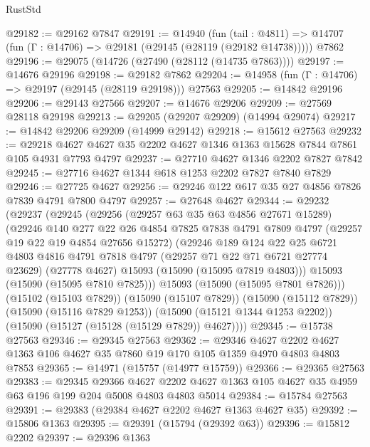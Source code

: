 \begin{lexlean}{RustStd}
\begin{coremodule}
@29182 := @29162 @7847
@29191 := @14940
    (fun (tail : @4811) => @14707 (fun (Γ : @14706) => @29181 (@29145 (@28119 (@29182 @14738)))))
    @7862
@29196 := @29075 (@14726 (@27490 (@28112 (@14735 @7863))))
@29197 := @14676 @29196
@29198 := @29182 @7862
@29204 := @14958 (fun (Γ : @14706) => @29197 (@29145 (@28119 @29198))) @27563
@29205 := @14842 @29196
@29206 := @29143 @27566
@29207 := @14676 @29206
@29209 := @27569 @28118 @29198
@29213 := @29205 (@29207 @29209) (@14994 @29074)
@29217 := @14842 @29206 @29209 (@14999 @29142)
@29218 := @15612 @27563
@29232 := @29218 @4627 @4627 @35 @2202 @4627 @1346 @1363 @15628 @7844 @7861 @105 @4931 @7793 @4797
@29237 := @27710 @4627 @1346 @2202 @7827 @7842
@29245 := @27716 @4627 @1344 @618 @1253 @2202 @7827 @7840 @7829
@29246 := @27725 @4627
@29256 := @29246 @122 @617 @35 @27 @4856 @7826 @7839 @4791 @7800 @4797
@29257 := @27648 @4627
@29344 := @29232
    (@29237
      (@29245
        (@29256
          (@29257 @63 @35 @63 @4856 @27671 @15289)
          (@29246
            @140
            @277
            @22
            @26
            @4854
            @7825
            @7838
            @4791
            @7809
            @4797
            (@29257 @19 @22 @19 @4854 @27656 @15272)
            (@29246
              @189
              @124
              @22
              @25
              @6721
              @4803
              @4816
              @4791
              @7818
              @4797
              (@29257 @71 @22 @71 @6721 @27774 @23629)
              (@27778 @4627)
              @15093
              (@15090 (@15095 @7819 @4803)))
            @15093
            (@15090 (@15095 @7810 @7825)))
          @15093
          (@15090 (@15095 @7801 @7826)))
        (@15102 (@15103 @7829))
        (@15090 (@15107 @7829))
        (@15090 (@15112 @7829))
        (@15090 (@15116 @7829 @1253))
        (@15090 (@15121 @1344 @1253 @2202))
        (@15090 (@15127 (@15128 (@15129 @7829)) @4627))))
@29345 := @15738 @27563
@29346 := @29345 @27563
@29362 := @29346
    @4627
    @2202
    @4627
    @1363
    @106
    @4627
    @35
    @7860
    @19
    @170
    @105
    @1359
    @4970
    @4803
    @4803
    @7853
@29365 := @14971 (@15757 (@14977 @15759))
@29366 := @29365 @27563
@29383 := @29345
    @29366
    @4627
    @2202
    @4627
    @1363
    @105
    @4627
    @35
    @4959
    @63
    @196
    @199
    @204
    @5008
    @4803
    @4803
    @5014
@29384 := @15784 @27563
@29391 := @29383 (@29384 @4627 @2202 @4627 @1363 @4627 @35)
@29392 := @15806 @1363
@29395 := @29391 (@15794 (@29392 @63))
@29396 := @15812 @2202
@29397 := @29396 @1363

\end{coremodule}
\end{lexlean}
